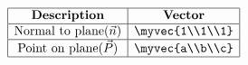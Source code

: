 \[
\begin{array}{|c|c|}
\hline
\textbf{Description} & \textbf{Vector} \\
\hline
\text{Normal to plane($\vec{n}$)} & \myvec{1\\1\\1} \\
\hline
\text{Point on plane($\vec{P}$)} & \myvec{a\\b\\c} \\
\hline
\end{array}
\]